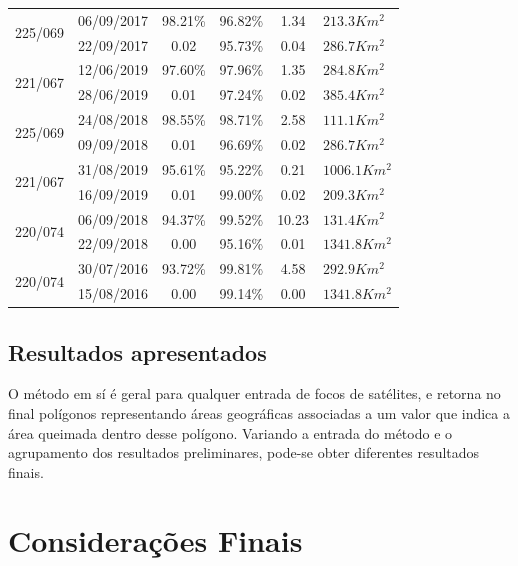 \documentclass[cic,tc]{iiufrgs}
\begin{document}
\begin{table}[htbp]
\begin{tabular}{cccccl}
\multirow{2}{*}{225/069} & 06/09/2017 & 98.21\% & 96.82\% & 1.34 & $213.3Km^2$ \\
                         & 22/09/2017 & 0.02 & 95.73\% & 0.04 & $286.7Km^2$ \\
\hline
\multirow{2}{*}{221/067} & 12/06/2019 & 97.60\% & 97.96\% & 1.35 & $284.8Km^2$ \\
                         & 28/06/2019 & 0.01 & 97.24\% & 0.02 & $385.4Km^2$ \\
\hline
\multirow{2}{*}{225/069} & 24/08/2018 & 98.55\% & 98.71\% & 2.58 & $111.1Km^2$ \\
                         & 09/09/2018 & 0.01 & 96.69\% & 0.02 & $286.7Km^2$ \\
\hline
\multirow{2}{*}{221/067} & 31/08/2019 & 95.61\% & 95.22\% & 0.21 & $1006.1Km^2$ \\
                         & 16/09/2019 & 0.01 & 99.00\% & 0.02 & $209.3Km^2$ \\
\hline
\multirow{2}{*}{220/074} & 06/09/2018 & 94.37\% & 99.52\% & 10.23 & $131.4Km^2$ \\
                         & 22/09/2018 & 0.00 & 95.16\% & 0.01 & $1341.8Km^2$ \\
\hline
\multirow{2}{*}{220/074} & 30/07/2016 & 93.72\% & 99.81\% & 4.58 & $292.9Km^2$ \\
                         & 15/08/2016 & 0.00 & 99.14\% & 0.00 & $1341.8Km^2$ \\
\bottomrule
\end{tabular}
\label{table:regioes_validação}
\end{table}


\section{Resultados apresentados}


O método em sí é geral para qualquer entrada de focos de satélites, e retorna no final polígonos representando áreas geográficas associadas a um valor que indica a área queimada dentro desse polígono. Variando a entrada do método e o agrupamento dos resultados preliminares, pode-se obter diferentes resultados finais. \par






\chapter{Considerações Finais}





\end{document}

